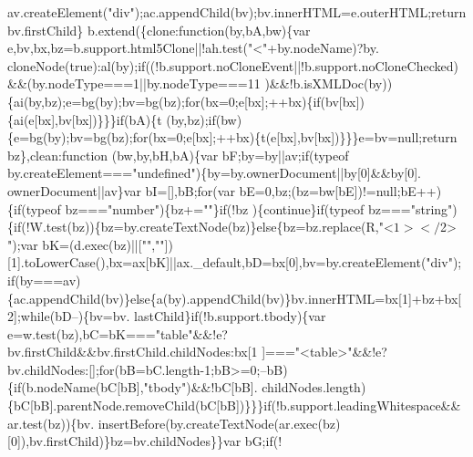 \begin{DoxyCode}
{      av.createElement(\textcolor{stringliteral}{"div"});ac.appendChild(bv);bv.innerHTML=e.outerHTML;\textcolor{keywordflow}{return} bv.firstChild\}
      b.extend(\{clone:\textcolor{keyword}{function}(by,bA,bw)\{var e,bv,bx,bz=b.support.html5Clone||!ah.test(\textcolor{stringliteral}{"<"}+by.nodeName)?by.
      cloneNode(\textcolor{keyword}{true}):al(by);\textcolor{keywordflow}{if}((!b.support.noCloneEvent||!b.support.noCloneChecked)&&(by.nodeType===1||by.nodeType===11
      )&&!b.isXMLDoc(by))\{ai(by,bz);e=bg(by);bv=bg(bz);\textcolor{keywordflow}{for}(bx=0;e[bx];++bx)\{\textcolor{keywordflow}{if}(bv[bx])\{ai(e[bx],bv[bx])\}\}\}\textcolor{keywordflow}{if}(bA)\{t
      (by,bz);\textcolor{keywordflow}{if}(bw)\{e=bg(by);bv=bg(bz);\textcolor{keywordflow}{for}(bx=0;e[bx];++bx)\{t(e[bx],bv[bx])\}\}\}e=bv=null;\textcolor{keywordflow}{return} bz\},clean:\textcolor{keyword}{function}
      (bw,by,bH,bA)\{var bF;by=by||av;\textcolor{keywordflow}{if}(typeof by.createElement===\textcolor{stringliteral}{"undefined"})\{by=by.ownerDocument||by[0]&&by[0].
      ownerDocument||av\}var bI=[],bB;\textcolor{keywordflow}{for}(var bE=0,bz;(bz=bw[bE])!=null;bE++)\{\textcolor{keywordflow}{if}(typeof bz===\textcolor{stringliteral}{"number"})\{bz+=\textcolor{stringliteral}{""}\}\textcolor{keywordflow}{if}(!bz
      )\{\textcolor{keywordflow}{continue}\}\textcolor{keywordflow}{if}(typeof bz===\textcolor{stringliteral}{"string"})\{\textcolor{keywordflow}{if}(!W.test(bz))\{bz=by.createTextNode(bz)\}\textcolor{keywordflow}{else}\{bz=bz.replace(R,\textcolor{stringliteral}{"<$1></$2>
      "});var bK=(d.exec(bz)||[\textcolor{stringliteral}{""},\textcolor{stringliteral}{""}])[1].toLowerCase(),bx=ax[bK]||ax.\_default,bD=bx[0],bv=by.createElement(\textcolor{stringliteral}{"div"});\textcolor{keywordflow}{
      if}(by===av)\{ac.appendChild(bv)\}\textcolor{keywordflow}{else}\{a(by).appendChild(bv)\}bv.innerHTML=bx[1]+bz+bx[2];\textcolor{keywordflow}{while}(bD--)\{bv=bv.
      lastChild\}\textcolor{keywordflow}{if}(!b.support.tbody)\{var e=w.test(bz),bC=bK===\textcolor{stringliteral}{"table"}&&!e?bv.firstChild&&bv.firstChild.childNodes:bx[1
      ]===\textcolor{stringliteral}{"<table>"}&&!e?bv.childNodes:[];\textcolor{keywordflow}{for}(bB=bC.length-1;bB>=0;--bB)\{\textcolor{keywordflow}{if}(b.nodeName(bC[bB],\textcolor{stringliteral}{"tbody"})&&!bC[bB].
      childNodes.length)\{bC[bB].parentNode.removeChild(bC[bB])\}\}\}\textcolor{keywordflow}{if}(!b.support.leadingWhitespace&&ar.test(bz))\{bv.
      insertBefore(by.createTextNode(ar.exec(bz)[0]),bv.firstChild)\}bz=bv.childNodes\}\}var bG;\textcolor{keywordflow}{if}(!
}
\end{DoxyCode}
